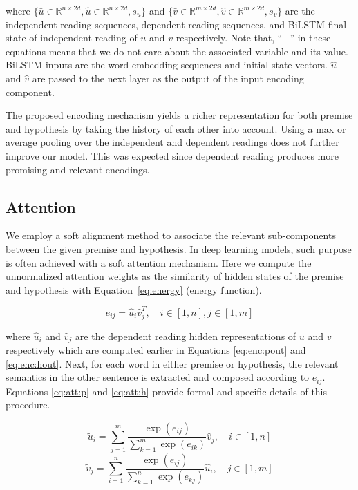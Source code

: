 \documentclass[11pt,a4paper]{article}
\begin{document}
	\noindent where $\{\bar{u} \in \mathbb{R}^{n \times 2d}, \hat{u} \in \mathbb{R}^{n \times 2d}, s_u \}$ and $\{\bar{v} \in \mathbb{R}^{m \times 2d}, \hat{v} \in \mathbb{R}^{m \times 2d}, s_v \}$ are the independent reading sequences, dependent reading sequences, and BiLSTM final state of independent reading of $u$ and $v$ respectively. Note that, ``$-$'' in these equations means that we do not care about the associated variable and its value. BiLSTM inputs are the word embedding sequences and initial state vectors. $\hat{u}$ and $\hat{v}$ are passed to the next layer as the output of the input encoding component. 
	
	The proposed encoding mechanism yields a richer representation for both premise and hypothesis by taking the history of each other into account. Using a max or average pooling over the independent and dependent readings does not further improve our model. This was expected since dependent reading produces more promising and relevant encodings.
	
	\subsection{Attention}
	\label{sec:att}
	
	We employ a soft alignment method to associate the relevant sub-components between the given premise and hypothesis. In deep learning models, such purpose is often achieved with a soft attention mechanism. Here we compute the unnormalized attention weights as the similarity of hidden states of the premise and hypothesis with Equation~\ref{eq:energy} (energy function).
	
	
	\begin{equation}
	e_{ij} = \hat{u}_i \hat{v}_j^T,  \quad  i \in [1,n], j \in [1,m]
	\label{eq:energy}
	\end{equation}
	
	\noindent where $\hat{u}_i$ and $\hat{v}_j$ are the dependent reading hidden representations of $u$ and $v$ respectively which are computed earlier in Equations \ref{eq:enc:pout} and \ref{eq:enc:hout}. Next, for each word in either premise or hypothesis, the relevant semantics in the other sentence is extracted and composed according to $e_{ij}$. Equations \ref{eq:att:p} and \ref{eq:att:h} provide formal and specific details of this procedure.
	
	\begin{equation}
	\tilde{u}_i = \sum_{j=1}^{m} \frac{\exp(e_{ij})}{\sum_{k=1}^{m} \exp(e_{ik})} \hat{v}_j, \quad i \in [1,n]
	\label{eq:att:p}
	\end{equation}
	\begin{equation}
	\tilde{v}_j = \sum_{i=1}^{n} \frac{\exp(e_{ij})}{\sum_{k=1}^{n} \exp(e_{kj})} \hat{u}_i, \quad j \in [1,m]
	\label{eq:att:h}
	\end{equation}
	
\end{document}
